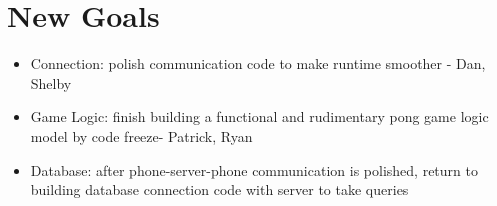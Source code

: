 \documentclass[11pt]{article} %
\begin{document}
\section{New Goals}

\begin{itemize}
        \item Connection: polish communication code to make runtime smoother - Dan, Shelby
       \item Game Logic: finish building a functional and rudimentary pong game logic model by code freeze- Patrick, Ryan
       \item Database: after phone-server-phone communication is polished, return to building database connection code with server to take queries
\end{itemize}
\end{document}
